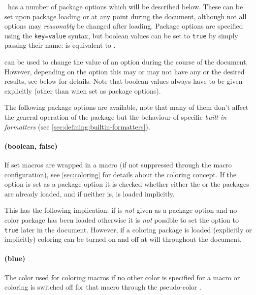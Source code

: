 \documentclass[12pt]{scrartcl}
\begin{document}
\luaformatters\ has a number of package options which will be described
below.  These can be set upon package loading or at any point during the
document, although not all options may \emph{reasonably} be changed after
loading.  Package options are specified using the \texttt{key=value} syntax, but
boolean values can be set to \texttt{true} by simply passing their name:
\luavar{[color]} is equivalent to \luavar{[color=true]}.

 can be used to change the value
of an option during the course of the document.  However, depending on the
option this may or may not have any or the desired results, see below for
details. Note that boolean values always have to be given explicitly (other than
when set as package options).

The following package options are available, note that many of them don't affect
the general operation of the package but the behaviour of specific
\emph{built-in formatters} (see \vref{sec:defining:builtin-formatters}).


\paragraph{ (boolean, false)}

If set macros are wrapped in a  macro (if not suppressed through
the macro configuration),  see \vref{sec:coloring} for details about the
coloring concept.  If the option is set as a package option it is checked
whether either the  or the  packages are already
loaded, and if neither is,  is loaded implicitly.

This has the following implication: if  is \emph{not} given as a
package option and no color package has been loaded otherwise it is \emph{not}
possible to set the option to \texttt{true} later in the document.  However, if
a coloring package is loaded (explicitly or implicitly) coloring can be turned
on and off at will throughout the document.

\paragraph{ (blue)}

The color used for coloring macros if no other color is specified for a macro or
coloring is switched off for that macro through the pseudo-color
.
\end{document}
